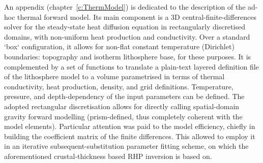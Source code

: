 An appendix (chapter~\ref{c:ThermModel}) is dedicated to the description of the ad-hoc thermal forward model.
Its main component is a 3D central-finite-differences solver for the steady-state heat diffusion equation in rectangularly discretised domains, with non-uniform heat production and conductivity.
Over a standard `box` configuration, it allows for non-flat constant temperature (Dirichlet) boundaries: topography and isotherm lithosphere base, for these purposes.
It is complemented by a set of functions to translate a plain-text layered definition file of the lithosphere model to a volume parametrised in terms of thermal conductivity, heat production, density, and grid definitions.
Temperature, pressure, and depth-dependency of the input parameters can be defined.
The adopted rectangular discretisation allows for directly calling spatial-domain gravity forward modelling (prism-defined, thus completely coherent with the model elements).
Particular attention was paid to the model efficiency, chiefly in building the coefficient matrix of the finite differences.
This allowed to employ it in an iterative subsequent-substitution parameter fitting scheme, on which the aforementioned crustal-thickness based RHP inversion is based on.

\nocite{Pastorutti2019}

